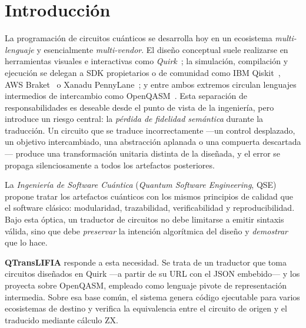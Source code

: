 \documentclass[11pt,a4paper]{article}
\begin{document}
\section{Introducción}

La programación de circuitos cuánticos se desarrolla hoy en un ecosistema
\emph{multi-lenguaje} y esencialmente \emph{multi-vendor}. El diseño conceptual suele
realizarse en herramientas visuales e interactivas como \emph{Quirk}~\cite{gidney2016quirk};
la simulación, compilación y ejecución se delegan a SDK propietarios o de comunidad como
IBM Qiskit~\cite{qiskit}, AWS Braket~\cite{braket} o Xanadu PennyLane~\cite{pennylane}; y
entre ambos extremos circulan lenguajes intermedios de intercambio como
OpenQASM~\cite{cross2017openqasm, openqasm3}. Esta separación de responsabilidades es
deseable desde el punto de vista de la ingeniería, pero introduce un riesgo central: la
\emph{pérdida de fidelidad semántica} durante la traducción. Un circuito que se traduce
incorrectamente ---un control desplazado, un objetivo intercambiado, una abstracción
aplanada o una compuerta descartada--- produce una transformación unitaria distinta de la
diseñada, y el error se propaga silenciosamente a todos los artefactos posteriores.

La \emph{Ingeniería de Software Cuántica} (\emph{Quantum Software Engineering},
QSE)~\cite{qse} propone tratar los artefactos cuánticos con los mismos principios de
calidad que el software clásico: modularidad, trazabilidad, verificabilidad y
reproducibilidad. Bajo esta óptica, un traductor de circuitos no debe limitarse a emitir
sintaxis válida, sino que debe \emph{preservar} la intención algorítmica del diseño y
\emph{demostrar} que lo hace.

\textbf{QTransLIFIA} responde a esta necesidad. Se trata de un traductor que toma circuitos
diseñados en Quirk ---a partir de su URL con el JSON embebido--- y los proyecta sobre
OpenQASM, empleado como lenguaje pivote de representación intermedia. Sobre esa base común,
el sistema genera código ejecutable para varios ecosistemas de destino y verifica la
equivalencia entre el circuito de origen y el traducido mediante cálculo ZX.
\end{document}
